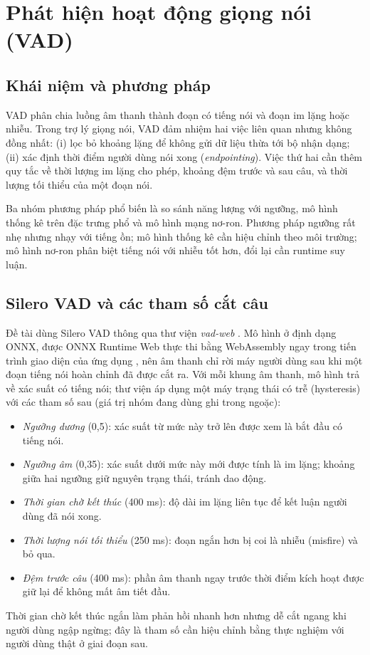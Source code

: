 \section{Phát hiện hoạt động giọng nói (VAD)}
\subsection{Khái niệm và phương pháp}
VAD phân chia luồng âm thanh thành đoạn có tiếng nói và đoạn im lặng hoặc nhiễu. Trong trợ lý giọng nói, VAD đảm nhiệm hai việc liên quan nhưng không đồng nhất: (i) lọc bỏ khoảng lặng để không gửi dữ liệu thừa tới bộ nhận dạng; (ii) xác định thời điểm người dùng nói xong (\textit{endpointing}). Việc thứ hai cần thêm quy tắc về thời lượng im lặng cho phép, khoảng đệm trước và sau câu, và thời lượng tối thiểu của một đoạn nói.

Ba nhóm phương pháp phổ biến là so sánh năng lượng với ngưỡng, mô hình thống kê trên đặc trưng phổ \cite{sohnvad} và mô hình mạng nơ-ron. Phương pháp ngưỡng rất nhẹ nhưng nhạy với tiếng ồn; mô hình thống kê cần hiệu chỉnh theo môi trường; mô hình nơ-ron phân biệt tiếng nói với nhiễu tốt hơn, đổi lại cần runtime suy luận.

\subsection{Silero VAD và các tham số cắt câu}
Đề tài dùng Silero VAD \cite{silero} thông qua thư viện \textit{vad-web} \cite{vadweb}. Mô hình ở định dạng ONNX, được ONNX Runtime Web thực thi bằng WebAssembly ngay trong tiến trình giao diện của ứng dụng \cite{onnxweb}, nên âm thanh chỉ rời máy người dùng sau khi một đoạn tiếng nói hoàn chỉnh đã được cắt ra. Với mỗi khung âm thanh, mô hình trả về xác suất có tiếng nói; thư viện áp dụng một máy trạng thái có trễ (hysteresis) với các tham số sau (giá trị nhóm đang dùng ghi trong ngoặc):
\begin{itemize}
  \item \textit{Ngưỡng dương} (0,5): xác suất từ mức này trở lên được xem là bắt đầu có tiếng nói.
  \item \textit{Ngưỡng âm} (0,35): xác suất dưới mức này mới được tính là im lặng; khoảng giữa hai ngưỡng giữ nguyên trạng thái, tránh dao động.
  \item \textit{Thời gian chờ kết thúc} (400 ms): độ dài im lặng liên tục để kết luận người dùng đã nói xong.
  \item \textit{Thời lượng nói tối thiểu} (250 ms): đoạn ngắn hơn bị coi là nhiễu (misfire) và bỏ qua.
  \item \textit{Đệm trước câu} (400 ms): phần âm thanh ngay trước thời điểm kích hoạt được giữ lại để không mất âm tiết đầu.
\end{itemize}
Thời gian chờ kết thúc ngắn làm phản hồi nhanh hơn nhưng dễ cắt ngang khi người dùng ngập ngừng; đây là tham số cần hiệu chỉnh bằng thực nghiệm với người dùng thật ở giai đoạn sau.

